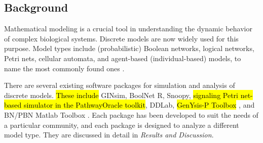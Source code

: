 \documentclass[10pt]{bmc_article}
\newenvironment{bmcformat}{\begin{raggedright}\baselineskip20pt\sloppy\setboolean{publ}{false}}{\end{raggedright}\baselineskip20pt\sloppy}
\begin{document}
\begin{bmcformat}




\section*{Background}
Mathematical modeling is a crucial tool in understanding the dynamic behavior
of complex biological systems. Discrete models are now widely used for this
purpose. Model types include (probabilistic) Boolean networks, logical
networks, Petri nets, cellular automata, and agent-based (individual-based)
models, to name the most commonly found ones \cite{Steggles, heiner-petri,
shmulevich, Chaouiya, cell-automata, springer_book}. 

There are several existing software packages for simulation and analysis of discrete models. \hl{These include} GINsim, BoolNet R, Snoopy, \hl{signaling Petri net-based simulator in the PathwayOracle toolkit}, DDLab, \hl{GenYsis-P Toolbox }, and BN/PBN Matlab Toolbox \cite{GINsim,boolnet,Snoopy,DDLab,shmulevich-matlab,Garg2008,Dubrova2010,Ruths2008}. Each package has been developed to suit the needs of a particular community, and each package is designed to analyze a different model type. They are discussed in detail in {\it Results and Discussion}. 


\end{bmcformat}
\end{document}
